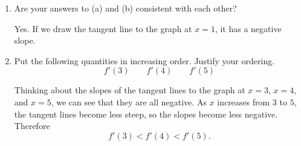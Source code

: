 \documentclass{article}
\begin{document}
\begin{enumerate}
\begin{enumerate}
  \item
    \begin{problem}[0.75in]
      Are your answers to (a) and (b) consistent with each other? 
    \end{problem}

    \begin{solution}
      Yes. If we draw the tangent line to the graph at $x=1$, it has a negative slope.

    \end{solution}

  \item
    \begin{problem}[\vfill]
      Put the following quantities in increasing order. Justify your ordering. 
      \[ f'(3) \qquad f'(4) \qquad f'(5) \]
    \end{problem}

    \begin{solution}
      Thinking about the slopes of the tangent lines to the graph at $x=3$, $x=4$,
      and $x=5$, we can see that they are all negative. As $x$ increases from $3$ to $5$,
      the tangent lines become less steep, so the slopes become less negative. Therefore
      \[f'(3) < f'(4) < f'(5).\]
    \end{solution}
  \end{enumerate}

\end{enumerate}
\end{document}
